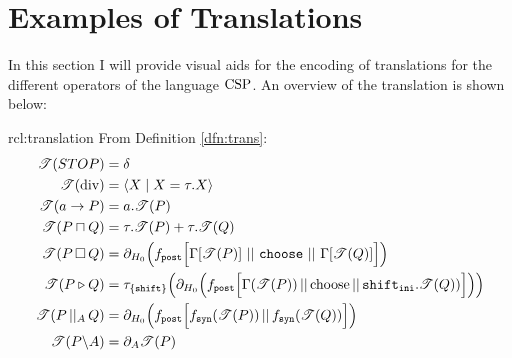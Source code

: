 \documentclass[../hons_project.tex]{subfiles}
\begin{document}
\section{Examples of Translations}
In this section I will provide visual aids for the encoding of translations for the different operators of the language $\mathrm{CSP}$. An overview of the translation is shown below:

\begin{rcl}[Translation]{rcl:translation}{}
	From Definition \ref{dfn:trans}:
	\begin{align*}
		\trans{STOP}           & = \delta                                                                                                                                                                                     \\
		\trans{\mathrm{div}}   & = \langle X \mid X = \tau.X \rangle                                                                                                                                                          \\
		\trans{a \to P}        & = a.\trans{P}                                                                                                                                                                                \\
		\trans{P \intchoice Q} & = \tau.\trans{P} + \tau.\trans{Q}                                                                                                                                                            \\
		\trans{P \extchoice Q} & = \partial_{H_{0}}\Bigl(\fdef{post}\Bigl[\Gamma[\trans{P}]\, \merge \,\mathtt{choose}\, \merge \,\Gamma[\trans{Q}]\Bigl]\Bigr)                                                               \\
		\trans{P \sliding Q}   & = \tau_{\{\mathtt{shift}\}}\Bigl(\partial_{H_{0}}\Bigl(f_{\mathtt{post}}\Bigl[ \Gamma(\trans{P}) \merge \mathrm{choose} \merge \mathtt{shift}_{\mathtt{ini}} . \trans{Q}) \Bigr]\Bigr)\Bigr) \\
		\trans{P \pcomp Q}     & = \partial_{H_{0}}\Bigl(\fdef{post}\Bigl[\fdef{syn}(\trans{P}) \merge \fdef{syn}(\trans{Q})\Bigr]\Bigr)                                                                                      \\
		\trans{P \backslash A} & = \partial_{A}{\trans{P}}                                                                                                                                                                    \\

\end{align*}
\end{rcl}
\end{document}
